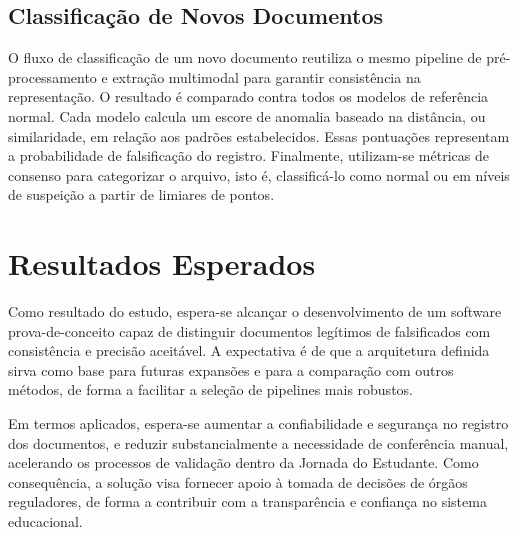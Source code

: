 \documentclass[12pt]{article}
\begin{document}
\subsection{Classificação de Novos Documentos}

O fluxo de classificação de um novo documento reutiliza o mesmo pipeline de pré-processamento e extração multimodal para garantir consistência na representação. O resultado é comparado contra todos os modelos de referência normal. Cada modelo calcula um escore de anomalia baseado na distância, ou similaridade, em relação aos padrões estabelecidos. Essas pontuações representam a probabilidade de falsificação do registro. Finalmente, utilizam-se métricas de consenso para categorizar o arquivo, isto é, classificá-lo como normal ou em níveis de suspeição a partir de limiares de pontos.

\section{Resultados Esperados}

Como resultado do estudo, espera-se alcançar o desenvolvimento de um software prova-de-conceito capaz de distinguir documentos legítimos de falsificados com consistência e precisão aceitável. A expectativa é de que a arquitetura definida sirva como base para futuras expansões e para a comparação com outros métodos, de forma a facilitar a seleção de pipelines mais robustos.

Em termos aplicados, espera-se aumentar a confiabilidade e segurança no registro dos documentos, e reduzir substancialmente a necessidade de conferência manual, acelerando os processos de validação dentro da Jornada do Estudante. Como consequência, a solução visa fornecer apoio à tomada de decisões de órgãos reguladores, de forma a contribuir com a transparência e confiança no sistema educacional.



\end{document}
